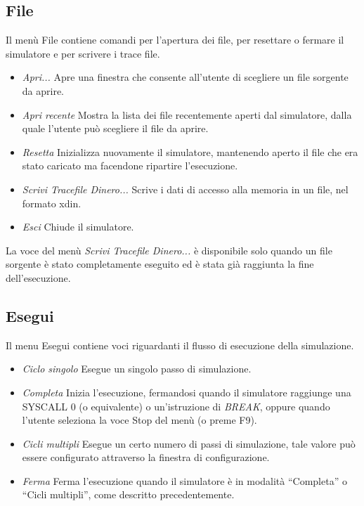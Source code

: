 \documentclass[letterpaper,10pt,italian]{sphinxmanual}
\begin{document}
\subsection{File}
\label{user-interface:file}
Il menù File contiene comandi per l'apertura dei file, per resettare o
fermare il simulatore e per scrivere i trace file.
\begin{itemize}
\item {} 
\emph{Apri...} Apre una finestra che consente all'utente di scegliere un file
sorgente da aprire.

\item {} 
\emph{Apri recente} Mostra la lista dei file recentemente aperti dal simulatore,
dalla quale l'utente può scegliere il file da aprire.

\item {} 
\emph{Resetta} Inizializza nuovamente il simulatore, mantenendo aperto il file
che era stato caricato ma facendone ripartire l'esecuzione.

\item {} 
\emph{Scrivi Tracefile Dinero...} Scrive i dati di accesso alla memoria in un
file, nel formato xdin.

\item {} 
\emph{Esci} Chiude il simulatore.

\end{itemize}

La voce del menù \emph{Scrivi Tracefile Dinero...} è disponibile solo quando un
file sorgente è stato completamente eseguito ed è stata già raggiunta la fine
dell'esecuzione.


\subsection{Esegui}
\label{user-interface:esegui}
Il menu Esegui contiene voci riguardanti il flusso di esecuzione della
simulazione.
\begin{itemize}
\item {} 
\emph{Ciclo singolo} Esegue un singolo passo di simulazione.

\item {} 
\emph{Completa} Inizia l'esecuzione, fermandosi quando il simulatore
raggiunge una SYSCALL 0 (o equivalente) o un'istruzione di \emph{BREAK},
oppure quando l'utente seleziona la voce Stop del menù (o preme F9).

\item {} 
\emph{Cicli multipli} Esegue un certo numero di passi di simulazione, tale
valore può essere configurato attraverso la finestra di configurazione.

\end{itemize}
\begin{itemize}
\item {} 
\emph{Ferma} Ferma l'esecuzione quando il simulatore è in modalità
``Completa'' o ``Cicli multipli'', come descritto precedentemente.

\end{itemize}
\end{document}
